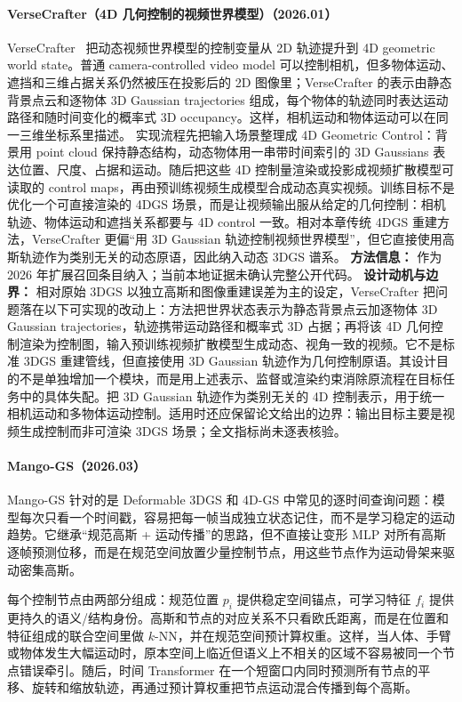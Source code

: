 \paragraph{VerseCrafter（4D 几何控制的视频世界模型）（2026.01）}
VerseCrafter~\cite{2601_05138} 把动态视频世界模型的控制变量从 2D 轨迹提升到 4D geometric world state。普通 camera-controlled video model 可以控制相机，但多物体运动、遮挡和三维占据关系仍然被压在投影后的 2D 图像里；VerseCrafter 的表示由静态背景点云和逐物体 3D Gaussian trajectories 组成，每个物体的轨迹同时表达运动路径和随时间变化的概率式 3D occupancy。这样，相机运动和物体运动可以在同一三维坐标系里描述。
实现流程先把输入场景整理成 4D Geometric Control：背景用 point cloud 保持静态结构，动态物体用一串带时间索引的 3D Gaussians 表达位置、尺度、占据和运动。随后把这些 4D 控制量渲染或投影成视频扩散模型可读取的 control maps，再由预训练视频生成模型合成动态真实视频。训练目标不是优化一个可直接渲染的 4DGS 场景，而是让视频输出服从给定的几何控制：相机轨迹、物体运动和遮挡关系都要与 4D control 一致。相对本章传统 4DGS 重建方法，VerseCrafter 更偏“用 3D Gaussian 轨迹控制视频世界模型”，但它直接使用高斯轨迹作为类别无关的动态原语，因此纳入动态 3DGS 谱系。
\textbf{方法信息：} 作为 2026 年扩展召回条目纳入；当前本地证据未确认完整公开代码。
\textbf{设计动机与边界：} 相对原始 3DGS 以独立高斯和图像重建误差为主的设定，VerseCrafter 把问题落在以下可实现的改动上：方法把世界状态表示为静态背景点云加逐物体 3D Gaussian trajectories，轨迹携带运动路径和概率式 3D 占据；再将该 4D 几何控制渲染为控制图，输入预训练视频扩散模型生成动态、视角一致的视频。它不是标准 3DGS 重建管线，但直接使用 3D Gaussian 轨迹作为几何控制原语。其设计目的不是单独增加一个模块，而是用上述表示、监督或渲染约束消除原流程在目标任务中的具体失配。把 3D Gaussian 轨迹作为类别无关的 4D 控制表示，用于统一相机运动和多物体运动控制。适用时还应保留论文给出的边界：输出目标主要是视频生成控制而非可渲染 3DGS 场景；全文指标尚未逐表核验。
\paragraph{Mango-GS（2026.03）\cite{2603_11543}}
Mango-GS 针对的是 Deformable 3DGS 和 4D-GS 中常见的逐时间查询问题：模型每次只看一个时间戳，容易把每一帧当成独立状态记住，而不是学习稳定的运动趋势。它继承“规范高斯 + 运动传播”的思路，但不直接让变形 MLP 对所有高斯逐帧预测位移，而是在规范空间放置少量控制节点，用这些节点作为运动骨架来驱动密集高斯。

每个控制节点由两部分组成：规范位置 $p_i$ 提供稳定空间锚点，可学习特征 $f_i$ 提供更持久的语义/结构身份。高斯和节点的对应关系不只看欧氏距离，而是在位置和特征组成的联合空间里做 $k$-NN，并在规范空间预计算权重。这样，当人体、手臂或物体发生大幅运动时，原本空间上临近但语义上不相关的区域不容易被同一个节点错误牵引。随后，时间 Transformer 在一个短窗口内同时预测所有节点的平移、旋转和缩放轨迹，再通过预计算权重把节点运动混合传播到每个高斯。

